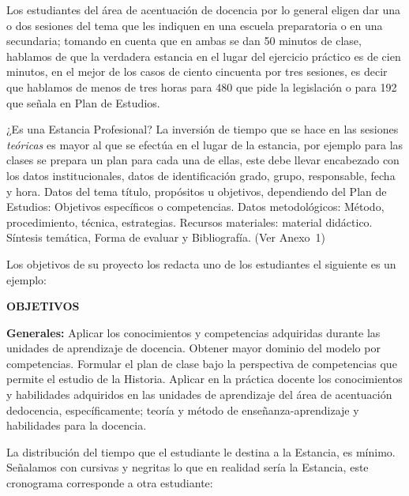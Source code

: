 Los estudiantes del área de acentuación de docencia por lo general eligen
dar una o dos sesiones del tema que les indiquen en una escuela
preparatoria o en una secundaria; tomando en cuenta que en ambas se dan 50 minutos
de clase, hablamos de que la verdadera estancia en el lugar del ejercicio
práctico es de cien minutos, en el mejor de los casos de ciento cincuenta
por tres sesiones, es decir que hablamos de menos de tres horas para 480
que pide la legislación o para 192 que señala en Plan de Estudios.


¿Es una Estancia Profesional? La inversión de tiempo que se hace en las
sesiones \textit{teóricas} es mayor al que se efectúa en el lugar de la
estancia, por ejemplo para las clases se prepara un plan para cada una de
ellas, este debe llevar encabezado con los datos institucionales, datos de
identificación grado, grupo, responsable, fecha y hora. Datos del tema
título, propósitos u objetivos, dependiendo del Plan de Estudios: Objetivos
específicos o competencias. Datos metodológicos: Método, procedimiento,
técnica, estrategias. Recursos materiales: material didáctico. Síntesis
temática, Forma de evaluar y Bibliografía. (Ver Anexo~1)


Los objetivos de su proyecto los redacta uno de los estudiantes el siguiente
es un ejemplo:

\medskip
\textbf{OBJETIVOS}

{\bfseries Generales:} Aplicar los conocimientos y competencias adquiridas durante las
unidades de aprendizaje de docencia. Obtener mayor dominio del modelo por
competencias. Formular el plan de clase bajo la perspectiva de competencias
que permite el estudio de la Historia. Aplicar en la práctica docente los
conocimientos y habilidades adquiridos en las unidades de aprendizaje del
área de acentuación de\linebreak  docencia, específicamente; teoría y método de
enseñanza-aprendizaje y habilidades para la docencia.  

La distribución del tiempo que el estudiante le destina a la Estancia, es
mínimo. Señalamos con cursivas y negritas lo que en realidad sería la
Estancia, este cronograma corresponde a otra estudiante:


